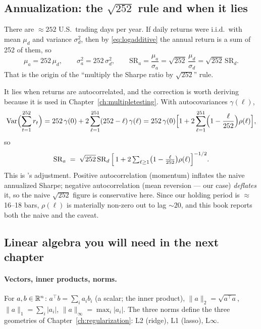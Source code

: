 \subsection{Annualization: the $\sqrt{252}$ rule and when it lies}
\label{sec:prob:annualization}

There are $\approx252$ U.S.\ trading days per year. If daily returns were i.i.d.\ with
mean $\mu_d$ and variance $\sigma_d^2$, then by \eqref{eq:logadditive} the annual return
is a sum of 252 of them, so
\begin{equation}
  \mu_a = 252\,\mu_d,
  \qquad
  \sigma_a^2 = 252\,\sigma_d^2,
  \qquad
  \mathrm{SR}_a = \frac{\mu_a}{\sigma_a} = \sqrt{252}\,\frac{\mu_d}{\sigma_d}
  = \sqrt{252}\,\mathrm{SR}_d .
  \label{eq:annualization}
\end{equation}
That is the origin of the ``multiply the Sharpe ratio by $\sqrt{252}$'' rule.

It lies when returns are autocorrelated, and the correction is worth deriving because
it is used in Chapter~\ref{ch:multipletesting}. With autocovariances $\gamma(\ell)$,
\[
  \operatorname{Var}\Bigl(\sum_{t=1}^{252} r_t\Bigr)
  = 252\,\gamma(0) + 2\sum_{\ell=1}^{251}(252-\ell)\,\gamma(\ell)
  = 252\,\gamma(0)\Bigl[1 + 2\sum_{\ell=1}^{251}\Bigl(1-\frac{\ell}{252}\Bigr)\rho(\ell)\Bigr],
\]
so
\begin{equation}
  \mathrm{SR}_a \;=\; \sqrt{252}\,\mathrm{SR}_d\,\Bigl[\,1+2\textstyle\sum_{\ell\ge1}
  \bigl(1-\tfrac{\ell}{252}\bigr)\rho(\ell)\Bigr]^{-1/2}.
  \label{eq:loadjust}
\end{equation}
This is \cite{lo2002statistics}'s adjustment. Positive autocorrelation (momentum)
inflates the naive annualized Sharpe; negative autocorrelation (mean reversion ---
our case) \emph{deflates} it, so the naive $\sqrt{252}$ figure is conservative here.
Since our holding period is $\approx$16--18 bars, $\rho(\ell)$ is materially non-zero
out to lag $\sim20$, and this book reports both the naive and the caveat.

\subsection{Linear algebra you will need in the next chapter}
\label{sec:prob:linalg}

\paragraph{Vectors, inner products, norms.} For $a,b\in\mathbb{R}^n$:
$a^{\top}b=\sum_i a_ib_i$ (a scalar; the inner product),
$\lVert a\rVert_2=\sqrt{a^{\top}a}$, $\lVert a\rVert_1=\sum_i\lvert a_i\rvert$,
$\lVert a\rVert_\infty=\max_i\lvert a_i\rvert$. The three norms define the three
geometries of Chapter~\ref{ch:regularization}: L2 (ridge), L1 (lasso), L$\infty$.

